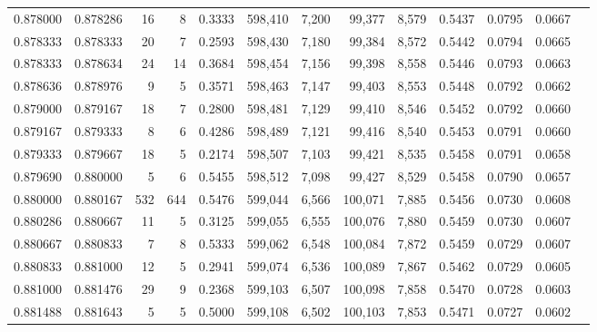 \begin{tabular}{rrrrrrrrrrrrr}
0.878000 & 0.878286 &    16 &   8 &                                     0.3333 & 598,410 &   7,200 &  99,377 &   8,579 & 0.5437 & 0.0795 & 0.0667 \\
0.878333 & 0.878333 &    20 &   7 &                                     0.2593 & 598,430 &   7,180 &  99,384 &   8,572 & 0.5442 & 0.0794 & 0.0665 \\
0.878333 & 0.878634 &    24 &  14 &                                     0.3684 & 598,454 &   7,156 &  99,398 &   8,558 & 0.5446 & 0.0793 & 0.0663 \\
0.878636 & 0.878976 &     9 &   5 &                                     0.3571 & 598,463 &   7,147 &  99,403 &   8,553 & 0.5448 & 0.0792 & 0.0662 \\
0.879000 & 0.879167 &    18 &   7 &                                     0.2800 & 598,481 &   7,129 &  99,410 &   8,546 & 0.5452 & 0.0792 & 0.0660 \\
0.879167 & 0.879333 &     8 &   6 &                                     0.4286 & 598,489 &   7,121 &  99,416 &   8,540 & 0.5453 & 0.0791 & 0.0660 \\
0.879333 & 0.879667 &    18 &   5 &                                     0.2174 & 598,507 &   7,103 &  99,421 &   8,535 & 0.5458 & 0.0791 & 0.0658 \\
0.879690 & 0.880000 &     5 &   6 &                                     0.5455 & 598,512 &   7,098 &  99,427 &   8,529 & 0.5458 & 0.0790 & 0.0657 \\
0.880000 & 0.880167 &   532 & 644 &                                     0.5476 & 599,044 &   6,566 & 100,071 &   7,885 & 0.5456 & 0.0730 & 0.0608 \\
0.880286 & 0.880667 &    11 &   5 &                                     0.3125 & 599,055 &   6,555 & 100,076 &   7,880 & 0.5459 & 0.0730 & 0.0607 \\
0.880667 & 0.880833 &     7 &   8 &                                     0.5333 & 599,062 &   6,548 & 100,084 &   7,872 & 0.5459 & 0.0729 & 0.0607 \\
0.880833 & 0.881000 &    12 &   5 &                                     0.2941 & 599,074 &   6,536 & 100,089 &   7,867 & 0.5462 & 0.0729 & 0.0605 \\
0.881000 & 0.881476 &    29 &   9 &                                     0.2368 & 599,103 &   6,507 & 100,098 &   7,858 & 0.5470 & 0.0728 & 0.0603 \\
0.881488 & 0.881643 &     5 &   5 &                                     0.5000 & 599,108 &   6,502 & 100,103 &   7,853 & 0.5471 & 0.0727 & 0.0602 \\

\end{tabular}

